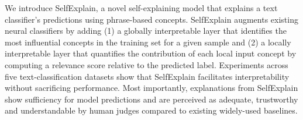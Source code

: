 We introduce SelfExplain, a novel self-explaining model that explains a text classifier's predictions using phrase-based concepts. SelfExplain augments existing neural classifiers by adding (1) a globally interpretable layer that identifies the most influential concepts in the training set for a given sample and (2) a locally interpretable layer that quantifies the contribution of each local input concept by computing a relevance score relative to the predicted label. Experiments across five text-classification datasets show that SelfExplain facilitates interpretability without sacrificing performance. Most importantly, explanations from SelfExplain show sufficiency for model predictions and are perceived as adequate, trustworthy and understandable by human judges compared to existing widely-used baselines.